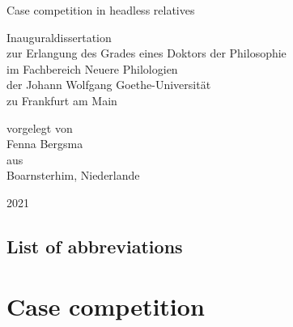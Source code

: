 \documentclass[hidelinks,a4paper,twoside,openright,11pt]{memoir}
\begin{document}

\frontmatter

\begin{titlingpage}

\center
\Large

\phantom{xx}

\vspace{6em}

{\Huge
Case competition in headless relatives}\\

\vspace{5em}

Inauguraldissertation\\
zur Erlangung des Grades eines Doktors der Philosophie\\
im Fachbereich Neuere Philologien\\
der Johann Wolfgang Goethe-Universität\\
zu Frankfurt am Main\\

\vspace{7em}

vorgelegt von\\
Fenna Bergsma\\
aus\\
Boarnsterhim, Niederlande\\

\vspace{7em}

2021

\end{titlingpage}

\clearpage



\clearpage
\tableofcontents

\clearpage
\listoftables

\clearpage
\listoffigures

\chapter*[List of abbreviations]{List of abbreviations}
\begingroup
  \setlength{\LTleft}{-\tabcolsep}
\printacronyms[include=abbr, heading=none]
\endgroup
{}


\mainmatter
\setcounter{secnumdepth}{4}



\part{Case competition}\label{part:case-facts}


\end{document}
